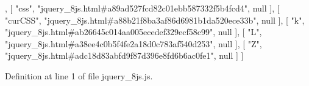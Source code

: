 \begin{DoxyCode}
    ,
    [ \textcolor{stringliteral}{"css"}, \textcolor{stringliteral}{"jquery\_8js.html#a89ad527fcd82c01ebb587332f5b4fcd4"}, null ],
    [ \textcolor{stringliteral}{"curCSS"}, \textcolor{stringliteral}{"jquery\_8js.html#a88b21f8ba3af86d6981b1da520ece33b"}, null ],
    [ \textcolor{stringliteral}{"k"}, \textcolor{stringliteral}{"jquery\_8js.html#ab26645c014aa005ecedef329ecf58c99"}, null ],
    [ \textcolor{stringliteral}{"L"}, \textcolor{stringliteral}{"jquery\_8js.html#a38ee4c0b5f4fe2a18d0c783af540d253"}, null ],
    [ \textcolor{stringliteral}{"Z"}, \textcolor{stringliteral}{"jquery\_8js.html#adc18d83abfd9f87d396e8fd6b6ac0fe1"}, null ]
]
\end{DoxyCode}


Definition at line 1 of file jquery\+\_\+8js.\+js.

